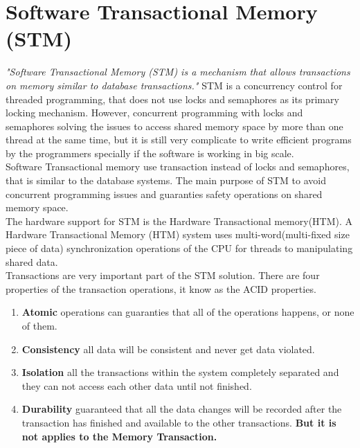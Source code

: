 \documentclass[12pt]{article}
\begin{document}
\clearpage

\section{Software Transactional Memory (STM)}
\textit{"Software Transactional Memory (STM) is a mechanism that allows transactions on memory similar to database transactions."}\cite{Haskell}
STM is a concurrency control for threaded programming, that does not use locks and semaphores as its primary locking mechanism. However, concurrent programming with locks and semaphores solving the issues to access shared memory space by more than one thread at the same time, but it is still very complicate to write efficient programs by the programmers specially if the software is working in big scale.\\

Software Transactional memory use transaction instead of locks and semaphores, that is similar to the database systems. The main purpose of STM to avoid concurrent programming issues and guaranties safety operations on shared memory space.\cite{Kasper}\\

The hardware support for STM is the Hardware Transactional memory(HTM).
A Hardware Transactional Memory (HTM) system uses multi-word(multi-fixed size piece of data) synchronization operations of the CPU for threads to manipulating shared data.\\

{\setlength{\parindent}{0cm}
Transactions are very important part of the STM solution.  
There are four properties of the transaction operations, it know as the ACID properties.}
\begin{enumerate}
\item \textbf{Atomic} operations can guaranties that all of the operations happens, or none of them.
\item \textbf{Consistency} all data will be consistent and never get data violated.
\item \textbf{Isolation} all the transactions within the system completely separated and they can not access each other data until not finished. 
\item \textbf{Durability} guaranteed that all the data changes will be recorded after the transaction has finished and available to the other transactions. \textbf{But it is not applies to the Memory Transaction.}
\end{enumerate}
\end{document}
